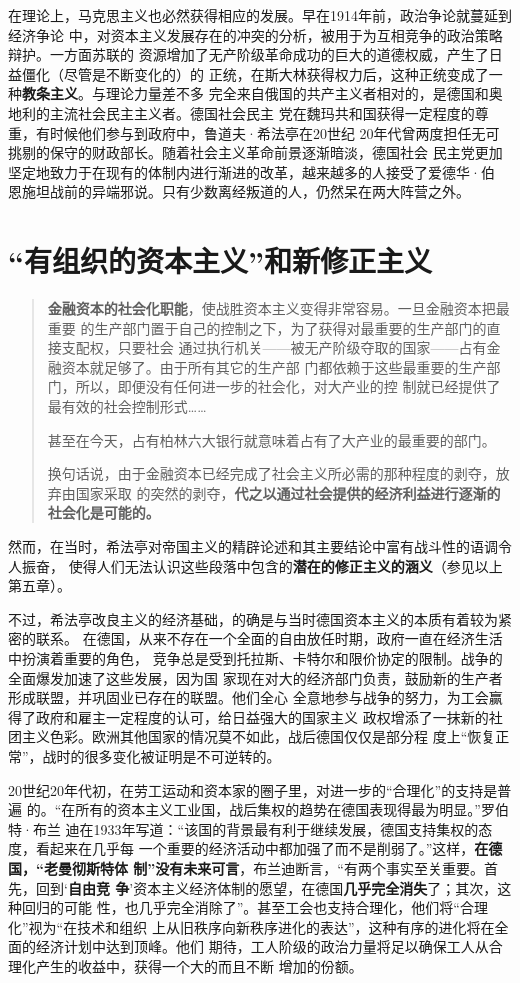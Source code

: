 在理论上，马克思主义也必然获得相应的发展。早在1914年前，政治争论就蔓延到经济争论
中，对资本主义发展存在的冲突的分析，被用于为互相竞争的政治策略辩护。一方面苏联的
资源增加了无产阶级革命成功的巨大的道德权威，产生了日益僵化（尽管是不断变化的）的
正统，在斯大林获得权力后，这种正统变成了一种\textbf{教条主义}。与理论力量差不多
完全来自俄国的共产主义者相对的，是德国和奥地利的主流社会民主主义者。德国社会民主
党在魏玛共和国获得一定程度的尊重，有时候他们参与到政府中，鲁道夫·希法亭在20世纪
20年代曾两度担任无可挑剔的保守的财政部长。随着社会主义革命前景逐渐暗淡，德国社会
民主党更加坚定地致力于在现有的体制内进行渐进的改革，越来越多的人接受了爱德华·伯
恩施坦战前的异端邪说。只有少数离经叛道的人，仍然呆在两大阵营之外。

\section{“有组织的资本主义”和新修正主义}

\begin{quotation}
  \textbf{金融资本的社会化职能}，使战胜资本主义变得非常容易。一旦金融资本把最重要
  的生产部门置于自己的控制之下，为了获得对最重要的生产部门的直接支配权，只要社会
  通过执行机关——被无产阶级夺取的国家——占有金融资本就足够了。由于所有其它的生产部
  门都依赖于这些最重要的生产部门，所以，即便没有任何进一步的社会化，对大产业的控
  制就已经提供了最有效的社会控制形式……

  甚至在今天，占有柏林六大银行就意味着占有了大产业的最重要的部门。

  换句话说，由于金融资本已经完成了社会主义所必需的那种程度的剥夺，放弃由国家采取
  的突然的剥夺，\textbf{代之以通过社会提供的经济利益进行逐渐的社会化是可能的。}
\end{quotation}
然而，在当时，希法亭对帝国主义的精辟论述和其主要结论中富有战斗性的语调令人振奋，
使得人们无法认识这些段落中包含的\textbf{潜在的修正主义的涵义}（参见以上第五章）。

不过，希法亭改良主义的经济基础，的确是与当时德国资本主义的本质有着较为紧密的联系。
在德国，从来不存在一个全面的自由放任时期，政府一直在经济生活中扮演着重要的角色，
竞争总是受到托拉斯、卡特尔和限价协定的限制。战争的全面爆发加速了这些发展，因为国
家现在对大的经济部门负责，鼓励新的生产者形成联盟，并巩固业已存在的联盟。他们全心
全意地参与战争的努力，为工会赢得了政府和雇主一定程度的认可，给日益强大的国家主义
政权增添了一抹新的社团主义色彩。欧洲其他国家的情况莫不如此，战后德国仅仅是部分程
度上“恢复正常”，战时的很多变化被证明是不可逆转的。

20世纪20年代初，在劳工运动和资本家的圈子里，对进一步的“合理化”的支持是普遍
的。“在所有的资本主义工业国，战后集权的趋势在德国表现得最为明显。”罗伯特·布兰
迪在1933年写道：“该国的背景最有利于继续发展，德国支持集权的态度，看起来在几乎每
一个重要的经济活动中都加强了而不是削弱了。”这样，\textbf{在德国，“老曼彻斯特体
制”没有未来可言}，布兰迪断言，“有两个事实至关重要。首先，回到‘\textbf{自由竞
争}’资本主义经济体制的愿望，在德国\textbf{几乎完全消失}了；其次，这种回归的可能
性，也几乎完全消除了”。甚至工会也支持合理化，他们将“合理化”视为“在技术和组织
上从旧秩序向新秩序进化的表达”，这种有序的进化将在全面的经济计划中达到顶峰。他们
期待，工人阶级的政治力量将足以确保工人从合理化产生的收益中，获得一个大的而且不断
增加的份额。


